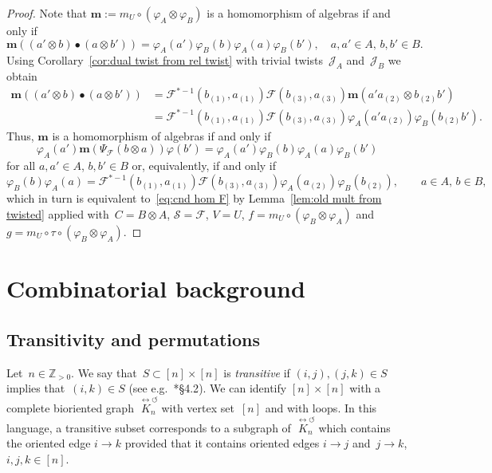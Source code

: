 \documentclass[12pt, reqno]{amsart}
\theoremstyle{definition}
\numberwithin{equation}{section}
\newcommand{\tensor}{\otimes}
\newcommand{\ZZ}{{\mathbb Z}}
\begin{document}
\begin{proof}
Note that $\mathbf m:=m_U\circ(\varphi_A\tensor\varphi_B)$ is a homomorphism of algebras
if and only if
$$
\mathbf m((a'\tensor b)\bullet(a\tensor b'))=
\varphi_A(a')\varphi_B(b)\varphi_A(a)\varphi_B(b'),
\quad a,a'\in A,\,b,b'\in B.
$$
Using Corollary~\ref{cor:dual twist from rel twist}
with trivial twists~$\mathcal J_A$ and~$\mathcal J_B$ we obtain
\begin{align*}
\mathbf m((a'\tensor b)\bullet(a\tensor b'))&=
\mathcal F^{\ast-1}(b_{(1)},a_{(1)})\mathcal F(b_{(3)},a_{(3)})
\mathbf m(a'a_{(2)}\tensor b_{(2)}b')
\\
&=\mathcal F^{\ast-1}(b_{(1)},a_{(1)})\mathcal F(b_{(3)},a_{(3)})
\varphi_A(a'a_{(2)})\varphi_B(b_{(2)}b').
\end{align*}
Thus, $\mathbf m$ is a homomorphism of algebras if and only if
$$
\varphi_A(a')\mathbf m(\Psi_{\mathcal F}(b\tensor a))
\varphi(b')=\varphi_A(a')\varphi_B(b)\varphi_A(a)\varphi_B(b')
$$
for all $a,a'\in A$, $b,b'\in B$ or, equivalently,
if and only if
$$
\varphi_B(b)\varphi_A(a)=\mathcal F^{\ast-1}(b_{(1)},a_{(1)})\mathcal F(b_{(3)},a_{(3)})
\varphi_A(a_{(2)})\varphi_B(b_{(2)}),\qquad a\in A,\,b\in B,
$$
which in turn is equivalent to~\eqref{eq:cnd hom F} by
Lemma~\ref{lem:old mult from twisted} applied with~$C=B\tensor A$, $\mathcal S=\mathcal F$,
$V=U$, 
$f=m_U\circ (\varphi_B\tensor\varphi_A)$ and~$g=m_U\circ\tau\circ (\varphi_B\tensor\varphi_A)$.
\end{proof}


























\section{Combinatorial background}


\subsection{Transitivity and permutations}\label{subs:trans}
Let~$n\in\ZZ_{>0}$.
We say that~$S\subset [n]\times [n]$ is {\em transitive} if $(i,j),(j,k)\in S$
implies that~$(i,k)\in S$ (see e.g.~\cite{ABGJ}*{\S4.2}). We 
can identify $[n]\times[n]$ with a complete bioriented graph~$\overset{\leftrightarrow\circlearrowleft}{K_n}$ with vertex set~$[n]$
and with loops. In this language, a transitive subset corresponds 
to a subgraph of~$\overset{\leftrightarrow\circlearrowleft}{K_n}$ which contains the oriented edge $i\to k$
provided that it contains oriented edges $i\to j$ and~$j\to k$, $i,j,k\in[n]$.
\end{document}
